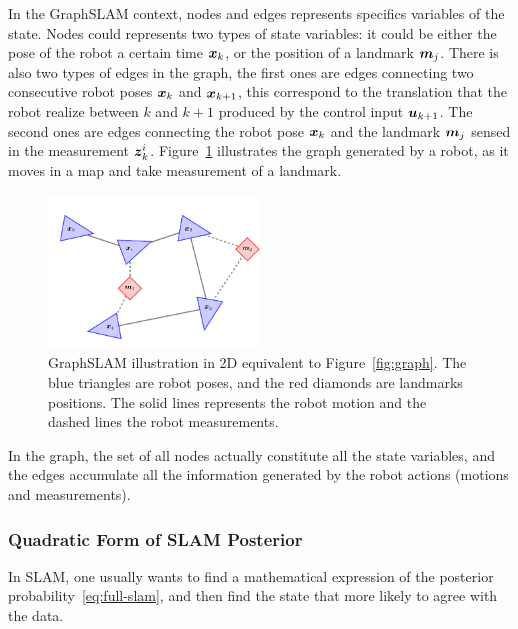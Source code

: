 In the GraphSLAM context, nodes and edges represents specifics variables of the state. Nodes could represents two types of state variables: it could be either the pose of the robot a certain time $\boldsymbol{x}_k$, or the position of a landmark $\boldsymbol{m}_j$. There is also two types of edges in the graph, the first ones are edges connecting two consecutive robot poses $\boldsymbol{x}_k$ and $\boldsymbol{x}_{k+1}$, this correspond to the translation that the robot realize between $k$ and $k+1$ produced by the control input $\boldsymbol{u}_{k+1}$. The second ones are edges connecting the robot pose $\boldsymbol{x}_k$ and the landmark $\boldsymbol{m}_j$ sensed in the measurement $\boldsymbol{z}_k^i$. Figure~\ref{fig:graphslam} illustrates the graph generated by a robot, as it moves in a map and take measurement of a landmark.

\begin{figure}[htbp!]
    \centering
    \includegraphics[width=0.5\textwidth]{tikz/graphslam.pdf}
    \caption[GraphSLAM ilustration in 2D]{GraphSLAM illustration in 2D equivalent to Figure~\ref{fig:graph}. The blue triangles are robot poses, and the red diamonds are landmarks positions. The solid lines represents the robot motion and the dashed lines the robot measurements.}
    \label{fig:graphslam}
\end{figure} 

In the graph, the set of all nodes actually constitute all the state variables, and the edges accumulate all the information generated by the robot actions (motions and measurements).

\subsubsection{Quadratic Form of SLAM Posterior}

In SLAM, one usually wants to find a mathematical expression of the posterior probability~\eqref{eq:full-slam}, and then find the state that more likely to agree with the data.

